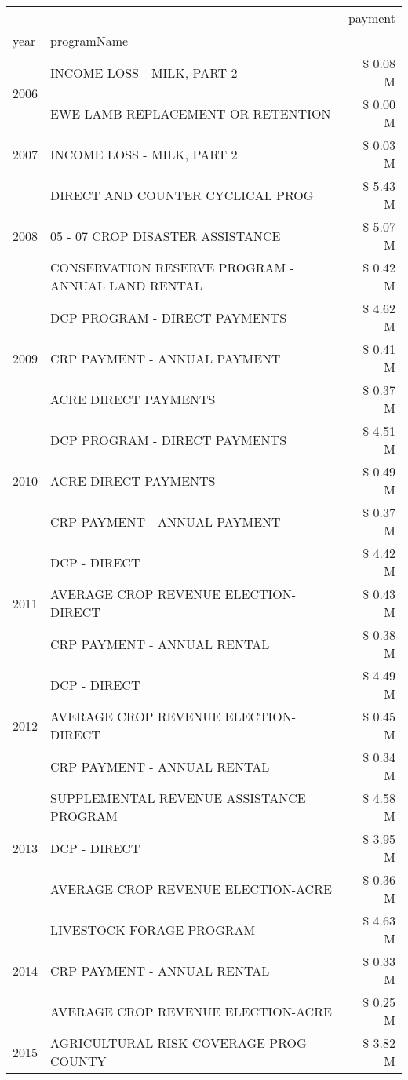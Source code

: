 \begin{tabular}{llr}
\toprule
 &  & payment \\
year & programName &  \\
\midrule
\multirow[t]{2}{*}{2006} & INCOME LOSS - MILK, PART 2 & \$ 0.08 M \\
 & EWE LAMB REPLACEMENT OR RETENTION & \$ 0.00 M \\
\cline{1-3}
2007 & INCOME LOSS - MILK, PART 2 & \$ 0.03 M \\
\cline{1-3}
\multirow[t]{3}{*}{2008} & DIRECT AND COUNTER CYCLICAL PROG & \$ 5.43 M \\
 & 05 - 07 CROP DISASTER ASSISTANCE & \$ 5.07 M \\
 & CONSERVATION RESERVE PROGRAM - ANNUAL LAND RENTAL & \$ 0.42 M \\
\cline{1-3}
\multirow[t]{3}{*}{2009} & DCP PROGRAM - DIRECT PAYMENTS & \$ 4.62 M \\
 & CRP PAYMENT - ANNUAL PAYMENT & \$ 0.41 M \\
 & ACRE DIRECT PAYMENTS & \$ 0.37 M \\
\cline{1-3}
\multirow[t]{3}{*}{2010} & DCP PROGRAM - DIRECT PAYMENTS & \$ 4.51 M \\
 & ACRE DIRECT PAYMENTS & \$ 0.49 M \\
 & CRP PAYMENT - ANNUAL PAYMENT & \$ 0.37 M \\
\cline{1-3}
\multirow[t]{3}{*}{2011} & DCP - DIRECT & \$ 4.42 M \\
 & AVERAGE CROP REVENUE ELECTION-DIRECT & \$ 0.43 M \\
 & CRP PAYMENT - ANNUAL RENTAL & \$ 0.38 M \\
\cline{1-3}
\multirow[t]{3}{*}{2012} & DCP - DIRECT & \$ 4.49 M \\
 & AVERAGE CROP REVENUE ELECTION-DIRECT & \$ 0.45 M \\
 & CRP PAYMENT - ANNUAL RENTAL & \$ 0.34 M \\
\cline{1-3}
\multirow[t]{3}{*}{2013} & SUPPLEMENTAL REVENUE ASSISTANCE PROGRAM & \$ 4.58 M \\
 & DCP - DIRECT & \$ 3.95 M \\
 & AVERAGE CROP REVENUE ELECTION-ACRE & \$ 0.36 M \\
\cline{1-3}
\multirow[t]{3}{*}{2014} & LIVESTOCK FORAGE PROGRAM & \$ 4.63 M \\
 & CRP PAYMENT - ANNUAL RENTAL & \$ 0.33 M \\
 & AVERAGE CROP REVENUE ELECTION-ACRE & \$ 0.25 M \\
\cline{1-3}
\multirow[t]{3}{*}{2015} & AGRICULTURAL RISK COVERAGE PROG - COUNTY & \$ 3.82 M \\

\end{tabular}
